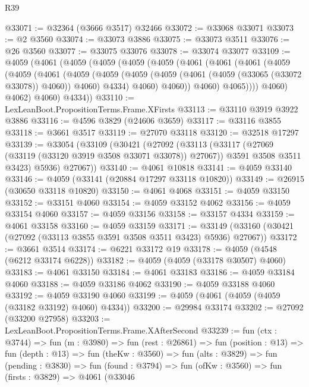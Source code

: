 \begin{lexlean}{R39}
\begin{coremodule}
@33071 := @32364 (@3666 @3517) @32466
@33072 := @33068 @33071
@33073 := @2 @3560
@33074 := @33073 @3886
@33075 := @33073 @3511
@33076 := @26 @3560
@33077 := @33075 @33076
@33078 := @33074 @33077
@33109 := @4059
    (@4061
      (@4059
        (@4059
          (@4059
            (@4059
              (@4061
                (@4061
                  (@4061
                    (@4059
                      (@4059
                        (@4061
                          (@4059
                            (@4059
                              (@4059
                                (@4059 (@4061 (@4059 (@33065 (@33072 @33078)) @4060)) @4060)
                                @4334)
                              @4060)
                            @4060))
                        @4060)
                      @4065))))
              @4060)
            @4062)
          @4060)
        @4334))
@33110 := LexLeanBoot.PropositionTerms.Frame.XFirsts
@33113 := @33110 @3919 @3922 @3886
@33116 := @4596 @3829 (@24606 @3659)
@33117 := @33116 @3855
@33118 := @3661 @3517
@33119 := @27070 @33118
@33120 := @32518 @17297
@33139 := @33054
    (@33109
      (@30421
        (@27092
          (@33113
            (@33117 (@27069 (@33119 (@33120 @3919 @3508 @33071 @33078)) @27067))
            @3591
            @3508
            @3511
            @3423)
          @5936)
        @27067))
@33140 := @4061 @10818
@33141 := @4059 @33140
@33146 := @4059 (@33141 (@20884 @17297 @33118 @10820))
@33149 := @26915 (@30650 @33118 @10820)
@33150 := @4061 @4068
@33151 := @4059 @33150
@33152 := @33151 @4060
@33154 := @4059 @33152 @4062
@33156 := @4059 @33154 @4060
@33157 := @4059 @33156
@33158 := @33157 @4334
@33159 := @4061 @33158
@33160 := @4059 @33159
@33171 := @33149 (@33160 (@30421 (@27092 (@33113 @3855 @3591 @3508 @3511 @3423) @5936) @27067))
@33172 := @3661 @3514
@33174 := @6221 @33172 @19
@33178 := @4059 (@4548 (@6212 @33174 @6228))
@33182 := @4059 (@4059 (@33178 @30507) @4060)
@33183 := @4061 @33150
@33184 := @4061 @33183
@33186 := @4059 @33184 @4060
@33188 := @4059 @33186 @4062
@33190 := @4059 @33188 @4060
@33192 := @4059 @33190 @4060
@33199 := @4059 (@4061 (@4059 (@4059 (@33182 @33192) @4060) @4334))
@33200 := @29984 @33174
@33202 := @27092 (@33200 @27958)
@33203 := LexLeanBoot.PropositionTerms.Frame.XAfterSecond
@33239 := fun (ctx : @3744) =>
  fun (m : @3980) =>
  fun (rest : @26861) =>
  fun (position : @13) =>
  fun (depth : @13) =>
  fun (theKw : @3560) =>
  fun (alts : @3829) =>
  fun (pending : @3830) =>
  fun (found : @3794) =>
  fun (ofKw : @3560) =>
  fun (firsts : @3829) =>
  @4061
    (@33046

\end{coremodule}
\end{lexlean}
